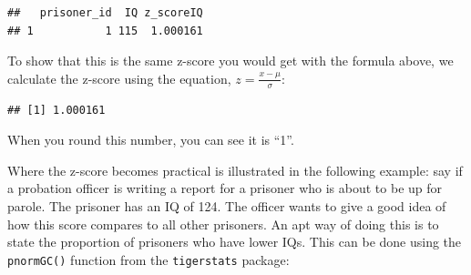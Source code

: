 \documentclass[
]{book}
\newenvironment{Shaded}{\begin{snugshade}}{\end{snugshade}}
\newcommand{\CommentTok}[1]{\textcolor[rgb]{0.56,0.35,0.01}{\textit{#1}}}
\newcommand{\DecValTok}[1]{\textcolor[rgb]{0.00,0.00,0.81}{#1}}
\newcommand{\FunctionTok}[1]{\textcolor[rgb]{0.00,0.00,0.00}{#1}}
\newcommand{\NormalTok}[1]{#1}
\newcommand{\OtherTok}[1]{\textcolor[rgb]{0.56,0.35,0.01}{#1}}
\newcommand{\SpecialCharTok}[1]{\textcolor[rgb]{0.00,0.00,0.00}{#1}}
\begin{document}
\begin{Shaded}
\end{Shaded}

\begin{verbatim}
##   prisoner_id  IQ z_scoreIQ
## 1           1 115  1.000161
\end{verbatim}

To show that this is the same z-score you would get with the formula above, we calculate the z-score using the equation, \(z = \frac{x - \mu}{\sigma}\):

\begin{Shaded}
\end{Shaded}

\begin{verbatim}
## [1] 1.000161
\end{verbatim}

When you round this number, you can see it is ``1''.

Where the z-score becomes practical is illustrated in the following example: say if a probation officer is writing a report for a prisoner who is about to be up for parole. The prisoner has an IQ of 124. The officer wants to give a good idea of how this score compares to all other prisoners. An apt way of doing this is to state the proportion of prisoners who have lower IQs. This can be done using the \texttt{pnormGC()} function from the \texttt{tigerstats} package:
\end{document}

